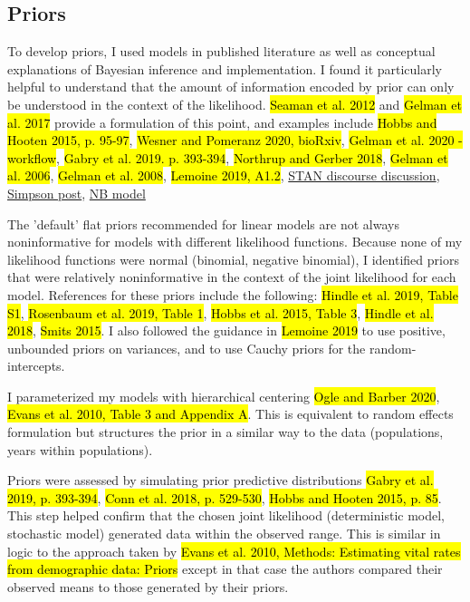 \documentclass[12pt, oneside, titlepage]{article}   	%
\begin{document}
\subsection*{Priors}

To develop priors, I used models in published literature as well as conceptual explanations of Bayesian inference and implementation. I found it particularly helpful to understand that the amount of information encoded by prior can only be understood in the context of the likelihood. \hl{Seaman et al. 2012} and \hl{Gelman et al. 2017} provide a formulation of this point, and examples include \hl{Hobbs and Hooten 2015, p. 95-97}, \hl{Wesner and Pomeranz 2020, bioRxiv}, \hl{Gelman et al. 2020 - workflow}, \hl{Gabry et al. 2019. p. 393-394}, \hl{Northrup and Gerber 2018}, \hl{Gelman et al. 2006}, \hl{Gelman et al. 2008}, \hl{Lemoine 2019, A1.2}, \href{https://discourse.mc-stan.org/t/choosing-weakly-informative-priors-for-population-level-effects-in-a-poisson-glmm/18008/5}{STAN discourse discussion}, \href{https://statmodeling.stat.columbia.edu/2018/09/12/against-arianism-2-arianism-grande/}{Simpson post}, \href{https://www.flutterbys.com.au/stats/tut/tut10.6b.html#h4_47}{NB model}

The 'default' flat priors recommended for linear models are not always noninformative for models with different likelihood functions. Because none of my likelihood functions were normal (binomial, negative binomial), I identified priors that were relatively noninformative in the context of the joint likelihood for each model. References for these priors include the following: \hl{Hindle et al. 2019, Table S1}, \hl{Rosenbaum et al. 2019, Table 1}, \hl{Hobbs et al. 2015, Table 3}, \hl{Hindle et al. 2018}, \hl{Smits 2015}. I also followed the guidance in \hl{Lemoine 2019} to use positive, unbounded priors on variances, and to use Cauchy priors for the random-intercepts. 

I parameterized my models with hierarchical centering \hl{Ogle and Barber 2020}, \hl{Evans et al. 2010, Table 3 and Appendix A}. This is equivalent to random effects formulation but structures the prior in a similar way to the data (populations, years within populations).

Priors were assessed by simulating prior predictive distributions \hl{Gabry et al. 2019, p. 393-394}, \hl{Conn et al. 2018, p. 529-530}, \hl{Hobbs and Hooten 2015, p. 85}. This step helped confirm that the chosen joint likelihood (deterministic model, stochastic model) generated data within the observed range. This is similar in logic to the approach taken by \hl{Evans et al. 2010, Methods: Estimating vital rates from demographic data: Priors} except in that case the authors compared their observed means to those generated by their priors.
\end{document}

